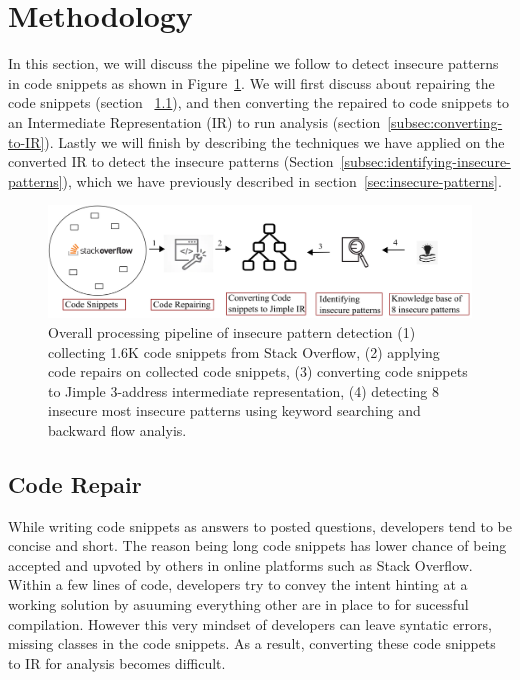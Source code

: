 \section{Methodology}
\label{sec:methodology}
In this section, we will discuss the pipeline we follow to detect insecure patterns in code snippets as shown in Figure~\ref{fig:pipeline}. 
We will first discuss about repairing the code snippets (section ~\ref{subsec:code-repair}), and then converting the repaired to code snippets 
to an Intermediate Representation (IR) to run analysis (section~\ref{subsec:converting-to-IR}). 
Lastly we will finish by describing the techniques we have applied on the converted IR to detect the insecure patterns 
(Section~\ref{subsec:identifying-insecure-patterns}), which we have previously described in section~\ref{sec:insecure-patterns}.     
\begin{figure}[t]
  \centering
  \includegraphics*[width=0.8\linewidth]{Figures/overall-process.png}
  \caption{Overall processing pipeline of insecure pattern detection (1) collecting 1.6K code snippets from Stack Overflow, 
  (2) applying code repairs on collected code snippets, (3) converting code snippets to Jimple 3-address intermediate representation,
  (4) detecting 8 insecure most insecure patterns using keyword searching and backward flow analyis.}
  \label{fig:pipeline}
\end{figure}


\subsection{Code Repair}
\label{subsec:code-repair}
While writing code snippets as answers to posted questions, developers tend to be concise and short. The reason being long code snippets 
has lower chance of being accepted and upvoted by others in online platforms such as Stack Overflow.
Within a few lines of code, developers try to convey the 
intent hinting at a working solution by asuuming everything other are in place to for sucessful compilation. 
However this very mindset of developers can leave syntatic errors, missing classes in the code snippets. 
As a result, converting these code snippets to IR for analysis becomes difficult.

